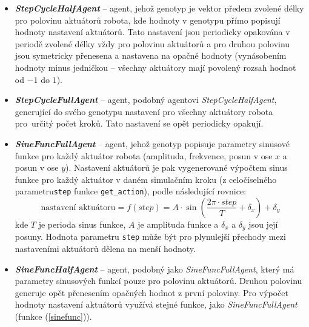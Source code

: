 \label{imp:gaAgents.stepcyclehalfagent}
\label{imp:gaAgents.sinefuncfullagent}
\label{imp:gaAgents.sinefunchalfagent}
\label{imp:gaAgents.stepcyclehalfagent}
\label{imp:gaAgents.TFSagent}
\begin{itemize}
    \item \textbf{\emph{StepCycleHalfAgent}} -- agent, jehož genotyp je vektor předem
        zvolené délky pro polovinu aktuátorů robota, kde hodnoty v genotypu přímo
        popisují hodnoty nastavení aktuátorů. Tato nastavení jsou periodicky
        opakována v periodě zvolené délky vždy pro polovinu aktuátorů a pro
        druhou polovinu jsou symetricky přenesena a nastavena na opačné
        hodnoty (vynásobením hodnoty minus jedničkou -- všechny aktuátory mají
        povolený rozsah hodnot od $-1$ do $1$).

    \item \textbf{\emph{StepCycleFullAgent}} -- agent, podobný agentovi
        \emph{StepCycleHalfAgent}, generující do svého genotypu nastavení pro
        všechny aktuátory robota pro~určitý počet kroků. Tato nastavení se opět
        periodicky opakují.

    \item \textbf{\emph{SineFuncFullAgent}} -- agent, jehož genotyp popisuje
        parametry sinusové funkce pro každý aktuátor robota (amplituda,
        frekvence, posun v ose $x$ a posun v ose $y$). Nastavení aktuátorů je
        pak vygenerované výpočtem sinus funkce pro každý aktuátor v daném
        simulačním kroku (z celočíselného parametru\texttt{step} funkce
        \texttt{get\_action}), podle následující rovnice:
        \begin{equation}
            \text{nastavení aktuátoru} = f(step) = A\cdot\sin(\frac{2\pi\cdot step}{T} + \delta_x) + \delta_y
            \label{sinefunc}
        \end{equation}
        kde $T$ je perioda sinus funkce, $A$ je amplituda funkce a $\delta_x$ a
        $\delta_y$ jsou její posuny. Hodnota parametru \texttt{step} může být
        pro plynulejší přechody mezi nastaveními aktuátorů dělena na menší
        hodnoty.

    \item \textbf{\emph{SineFuncHalfAgent}} -- agent, podobný jako
        \emph{SineFuncFullAgent}, který má parametry sinusových funkcí pouze pro
        polovinu aktuátorů. Druhou polovinu generuje opět přenesením opačných
        hodnot z první poloviny. Pro výpočet hodnoty nastavení aktuátorů
        využívá stejné funkce, jako \emph{SineFuncFullAgent} (funkce
        (\ref{sinefunc})).


\end{itemize}
